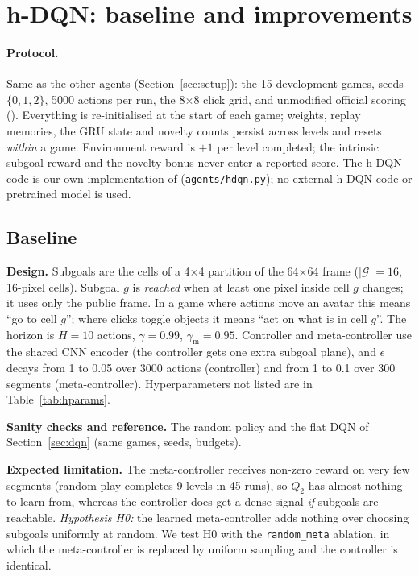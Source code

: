 \section{h-DQN: baseline and improvements}\label{sec:hdqn}

\paragraph{Protocol.} Same as the other agents (Section~\ref{sec:setup}): the 15
development games, seeds $\{0,1,2\}$, 5000 actions per run, the 8$\times$8 click
grid, and unmodified official scoring ().
Everything is re-initialised at the start of each game; weights, replay memories,
the GRU state and novelty counts persist across levels and resets \emph{within} a
game. Environment reward is $+1$ per level completed; the intrinsic subgoal reward
and the novelty bonus never enter a reported score. The h-DQN code is our own
implementation of \citet{kulkarni2016hdqn} (\texttt{agents/hdqn.py}); no external
h-DQN code or pretrained model is used.

\subsection{Baseline}\label{sec:hdqn-base}
\textbf{Design.} Subgoals are the cells of a 4$\times$4 partition of the 64$\times$64
frame ($|\mathcal G|=16$, 16-pixel cells). Subgoal $g$ is \emph{reached} when at
least one pixel inside cell $g$ changes; it uses only the public frame. In a game
where actions move an avatar this means ``go to cell $g$''; where clicks toggle
objects it means ``act on what is in cell $g$''. The horizon is $H=10$ actions,
$\gamma=0.99$, $\gamma_{\text{m}}=0.95$. Controller and meta-controller use the
shared CNN encoder (the controller gets one extra subgoal plane), and
$\epsilon$ decays from 1 to 0.05 over 3000 actions (controller) and from 1 to 0.1
over 300 segments (meta-controller). Hyperparameters not listed are in
Table~\ref{tab:hparams}.

\textbf{Sanity checks and reference.} The random policy and the flat DQN of
Section~\ref{sec:dqn} (same games, seeds, budgets).

\textbf{Expected limitation.} The meta-controller receives non-zero reward on
very few segments (random play completes 9 levels in 45 runs), so $Q_2$ has almost
nothing to learn from, whereas the controller does get a dense signal \emph{if}
subgoals are reachable. \emph{Hypothesis H0:} the learned meta-controller adds
nothing over choosing subgoals uniformly at random. We test H0 with the
\texttt{random\_meta} ablation, in which the meta-controller is replaced by
uniform sampling and the controller is identical.

